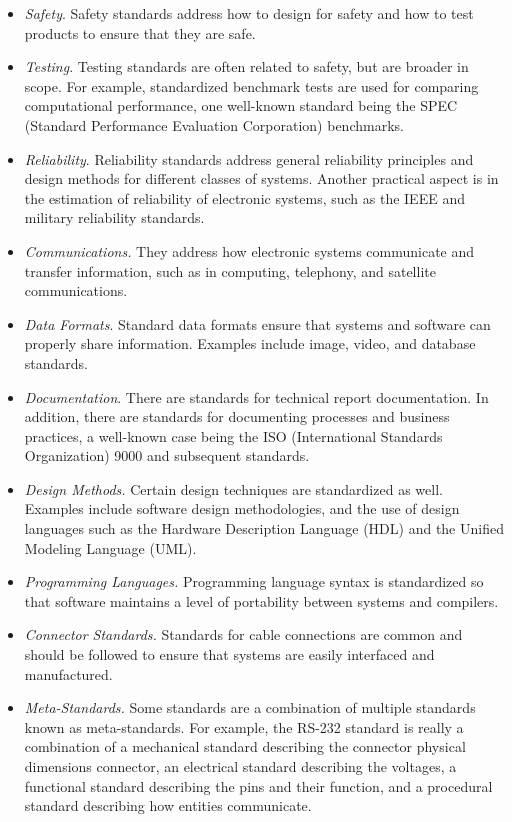 \begin{itemize}
\item
  \emph{Safety}. Safety standards address how to design for safety and
  how to test products to ensure that they are safe.
\item
  \emph{Testing}. Testing standards are often related to safety, but are
  broader in scope. For example, standardized benchmark tests are used
  for comparing computational performance, one well-known standard being
  the SPEC (Standard Performance Evaluation Corporation) benchmarks.
\item
  \emph{Reliability}. Reliability standards address general reliability
  principles and design methods for different classes of systems.
  Another practical aspect is in the estimation of reliability of
  electronic systems, such as the IEEE and military reliability
  standards.
\item
  \emph{Communications.} They address how electronic systems communicate
  and transfer information, such as in computing, telephony, and
  satellite communications.
\item
  \emph{Data Formats}. Standard data formats ensure that systems and
  software can properly share information. Examples include image,
  video, and database standards.
\item
  \emph{Documentation}. There are standards for technical report
  documentation. In addition, there are standards for documenting
  processes and business practices, a well-known case being the ISO
  (International Standards Organization) 9000 and subsequent standards.
\item
  \emph{Design Methods.} Certain design techniques are standardized as
  well. Examples include software design methodologies, and the use of
  design languages such as the Hardware Description Language (HDL) and
  the Unified Modeling Language (UML).
\item
  \emph{Programming Languages.} Programming language syntax is
  standardized so that software maintains a level of portability between
  systems and compilers.
\item
  \emph{Connector Standards.} Standards for cable connections are common
  and should be followed to ensure that systems are easily interfaced
  and manufactured.
\item
  \emph{Meta-Standards.} Some standards are a combination of multiple
  standards known as meta-standards. For example, the RS-232 standard is
  really a combination of a mechanical standard describing the connector
  physical dimensions connector, an electrical standard describing the
  voltages, a functional standard describing the pins and their
  function, and a procedural standard describing how entities
  communicate.
\end{itemize}

